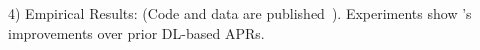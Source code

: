 

4) Empirical Results: (Code and data are published~\cite{CDFix2022}).
Experiments show {\tool}'s improvements over prior
DL-based APRs.







